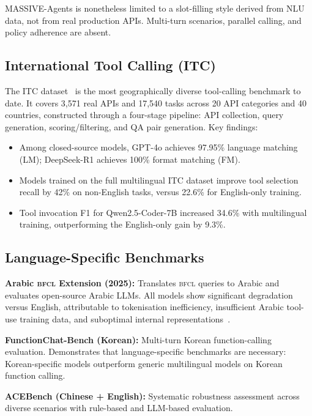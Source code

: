 \documentclass[11pt]{article}
\newcommand{\bfcl}{\textsc{bfcl}}
\begin{document}
MASSIVE-Agents is nonetheless limited to a slot-filling style derived from NLU data, not from real
production APIs. Multi-turn scenarios, parallel calling, and policy adherence are absent.

\subsection{International Tool Calling (ITC)}

The ITC dataset~\citep{itc2025} is the most geographically diverse tool-calling benchmark to date.
It covers 3,571 real APIs and 17,540 tasks across 20 API categories and 40 countries, constructed
through a four-stage pipeline: API collection, query generation, scoring/filtering, and QA pair
generation. Key findings:
\begin{itemize}[leftmargin=1.2em, itemsep=2pt]
  \item Among closed-source models, GPT-4o achieves 97.95\% language matching (LM); DeepSeek-R1
        achieves 100\% format matching (FM).
  \item Models trained on the full multilingual ITC dataset improve tool selection recall by 42\%
        on non-English tasks, versus 22.6\% for English-only training.
  \item Tool invocation F1 for Qwen2.5-Coder-7B increased 34.6\% with multilingual training,
        outperforming the English-only gain by 9.3\%.
\end{itemize}

\subsection{Language-Specific Benchmarks}

\textbf{Arabic \bfcl{} Extension (2025):} Translates \bfcl{} queries to Arabic and evaluates
open-source Arabic LLMs. All models show significant degradation versus English, attributable to
tokenisation inefficiency, insufficient Arabic tool-use training data, and suboptimal internal
representations~\citep{arabicbfcl2025}.

\textbf{FunctionChat-Bench (Korean):} Multi-turn Korean function-calling evaluation. Demonstrates
that language-specific benchmarks are necessary: Korean-specific models outperform generic
multilingual models on Korean function calling.

\textbf{ACEBench (Chinese + English):} Systematic robustness assessment across diverse scenarios
with rule-based and LLM-based evaluation.
\end{document}
